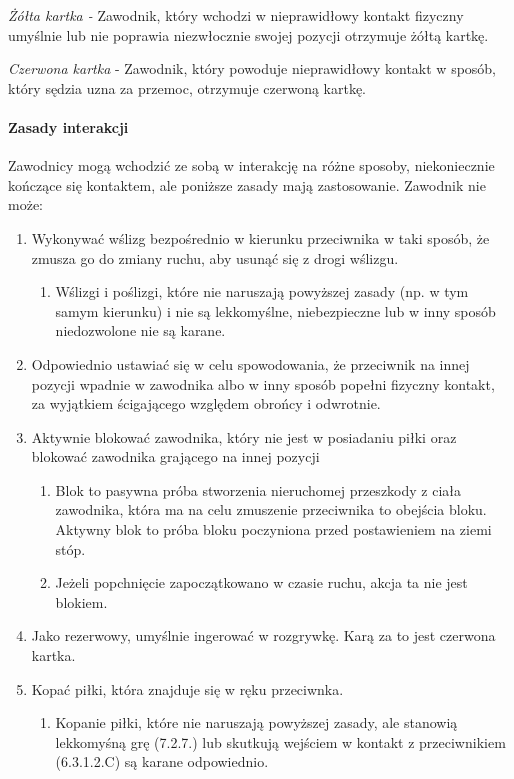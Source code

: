 \documentclass[12pt]{article}
\begin{document}
\emph{Żółta kartka -} Zawodnik, który wchodzi w nieprawidłowy kontakt
fizyczny umyślnie lub nie poprawia niezwłocznie swojej pozycji otrzymuje
żółtą kartkę.

\emph{Czerwona kartka} - Zawodnik, który powoduje nieprawidłowy kontakt
w sposób, który sędzia uzna za przemoc, otrzymuje czerwoną kartkę.

\paragraph{Zasady interakcji}
Zawodnicy mogą wchodzić ze sobą w
interakcję na różne sposoby, niekoniecznie kończące się kontaktem, ale
poniższe zasady mają zastosowanie. Zawodnik nie może:

\begin{enumerate}
\item
    Wykonywać wślizg bezpośrednio w kierunku przeciwnika w taki sposób, że
  zmusza go do zmiany ruchu, aby usunąć się z drogi wślizgu.
  
  \begin{enumerate}
  \item
        Wślizgi i poślizgi, które nie naruszają powyższej zasady (np. w tym
    samym kierunku) i nie są lekkomyślne, niebezpieczne lub w inny
    sposób niedozwolone nie są karane.
      \end{enumerate}
\item
    Odpowiednio ustawiać się w celu spowodowania, że przeciwnik na innej
  pozycji wpadnie w zawodnika albo w inny sposób popełni fizyczny
  kontakt, za wyjątkiem ścigającego względem obrońcy i odwrotnie.
  \item
    Aktywnie blokować zawodnika, który nie jest w posiadaniu piłki oraz
  blokować zawodnika grającego na innej pozycji
  
  \begin{enumerate}
  \item
        Blok to pasywna próba stworzenia nieruchomej przeszkody z ciała
    zawodnika, która ma na celu zmuszenie przeciwnika to obejścia bloku.
    Aktywny blok to próba bloku poczyniona przed postawieniem na ziemi
    stóp.
      \item
        Jeżeli popchnięcie zapoczątkowano w czasie ruchu, akcja ta nie jest
    blokiem.
      \end{enumerate}
\item
    Jako rezerwowy, umyślnie ingerować w rozgrywkę. Karą za to jest
  czerwona kartka.
  \item
    Kopać piłki, która znajduje się w ręku przeciwnka.
  
  \begin{enumerate}
  \item
        Kopanie piłki, które nie naruszają powyższej zasady, ale stanowią
    lekkomyśną grę (7.2.7.) lub skutkują wejściem w kontakt z
    przeciwnikiem (6.3.1.2.C) są karane odpowiednio.
      \end{enumerate}
\end{enumerate}
\end{document}
